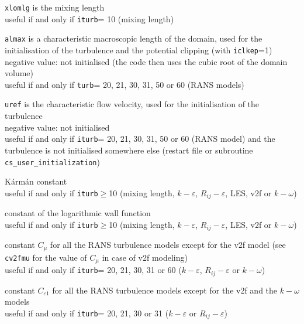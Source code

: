 {{\tt xlomlg} is the mixing length\\
useful if and only if {\tt iturb}= 10 (mixing length)}

{{\tt almax} is a characteristic macroscopic
length of the domain, used for the initialisation of the turbulence and
the potential clipping (with {\tt iclkep}=1)\\
negative value: not initialised (the code then uses the cubic root of
the domain volume)\\
useful if and only if {\tt turb}= 20, 21, 30, 31, 50 or 60 (RANS models)}

{{\tt uref} is the characteristic flow velocity,
used for the initialisation of the turbulence\\
negative value: not initialised\\
useful if and only if {\tt iturb}= 20, 21, 30, 31, 50 or 60 (RANS model)
and the turbulence is not initialised somewhere
else (restart file or subroutine \texttt{cs\_user\_initialization})}



{K\'arm\'an constant\\
useful if and only if {\tt iturb}$\geqslant$10
(mixing length, $k-\varepsilon$, $R_{ij}-\varepsilon$, LES, v2f or $k-\omega$)}

{constant of the logarithmic wall function\\
useful if and only if {\tt iturb}$\geqslant$10
(mixing length, $k-\varepsilon$, $R_{ij}-\varepsilon$, LES, v2f or $k-\omega$)}

{constant $C_\mu$ for all the RANS turbulence models except for the v2f model
(see {\tt cv2fmu} for the value of $C_\mu$ in case of v2f modeling)\\
useful if and only if {\tt iturb}= 20,
21, 30, 31 or 60 ($k-\varepsilon$, $R_{ij}-\varepsilon$ or $k-\omega$)}

{constant $C_{\varepsilon 1}$ for all the RANS turbulence models except
for the v2f and the $k-\omega$ models\\
useful if and only if {\tt iturb}= 20,
21, 30 or 31 ($k-\varepsilon$ or $R_{ij}-\varepsilon$)}

